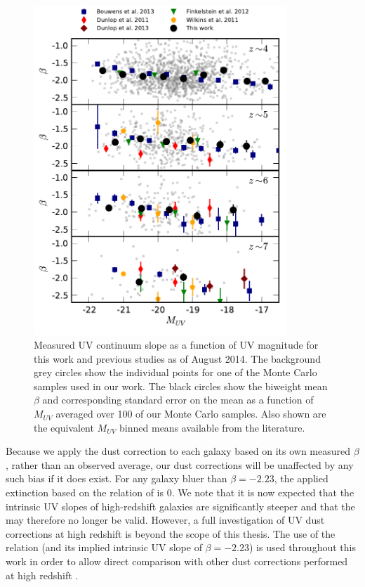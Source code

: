 \begin{figure}
\centering
\includegraphics[width=0.85\textwidth]{plots/figB2.pdf}
\caption[Measured UV continuum slope as a function of UV magnitude for this work and previous studies as of August 2014. ]{Measured UV continuum slope as a function of UV magnitude for this work and previous studies as of August 2014. The background grey circles show the individual points for one of the Monte Carlo samples used in our work. The black circles show the biweight mean $\beta$ and corresponding standard error on the mean as a function of $M_{UV}$ averaged over 100 of our Monte Carlo samples. Also shown are the equivalent $M_{UV}$ binned means available from the literature.}
\label{smf-fig:beta_muv}
\end{figure}

Because we apply the dust correction to each galaxy based on its own measured $\beta$, rather than an observed average, our dust corrections will be unaffected by any such bias if it does exist. For any galaxy bluer than $\beta = -2.23$, the applied extinction based on the relation of \citet{Meurer:1999jm} is 0. We note that it is now expected that the intrinsic UV slopes of high-redshift galaxies are significantly steeper \citep{Castellano:2014db,2015A&A...574A..19S} and that the \citet{Meurer:1999jm} may therefore no longer be valid. However, a full investigation of UV dust corrections at high redshift is beyond the scope of this thesis. The use of the \citet{Meurer:1999jm} relation (and its implied intrinsic UV slope of $\beta = -2.23$) is used throughout this work in order to allow direct comparison with other dust corrections performed at high redshift \citep{Smit:2012is}.


